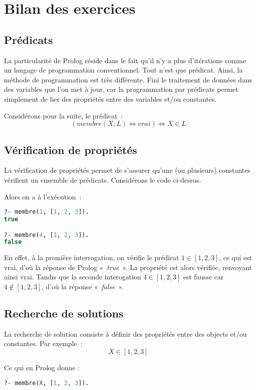 \chapter{Bilan des exercices}

\section{Prédicats}

La particularité de Prolog réside dans le fait qu'il n'y a plus d'itérations comme
un langage de programmation conventionnel. Tout n'est que prédicat. Ainsi, la
méthode de programmation est très différente. Fini le traitement de données
dans des variables que l'on met à jour, car la programmation par prédicats permet
simplement de lier des propriétés entre des variables et/ou constantes.

Considérons pour la suite, le prédicat~:
\[(membre(X, L) \Leftrightarrow vrai) \Leftrightarrow X \in L\]


\section{Vérification de propriétés}

La vérification de propriétés permet de s'assurer qu'une (ou plusieurs) constantes
vérifient un ensemble de prédicats. Considérons le code ci-dessus.

Alors on a à l'exécution~:

\begin{lstlisting}[language=Prolog,frame=single]
?- membre(1, [1, 2, 3]).
true

?- membre(4, [1, 2, 3]).
false
\end{lstlisting}

En effet, à la première interrogation, on vérifie le prédicat $1 \in [1, 2, 3]$,
ce qui est vrai, d'où la réponse de Prolog «~\textit{true}~». La propriété est alors vérifiée, 
renvoyant ainsi vrai. Tandis que la seconde interogation $4 \in [1, 2, 3]$ est fausse car 
$4 \notin [1, 2, 3]$, d'où la réponse «~\textit{false}~».


\section{Recherche de solutions}

La recherche de solution consiste à définir des propriétés entre des
objects et/ou constantes. Par exemple~:
\[
	X \in [1, 2, 3]
\]

 Ce qui en Prolog donne :
\begin{lstlisting}[language=Prolog,frame=single]
?- membre(X, [1, 2, 3]).
\end{lstlisting}

